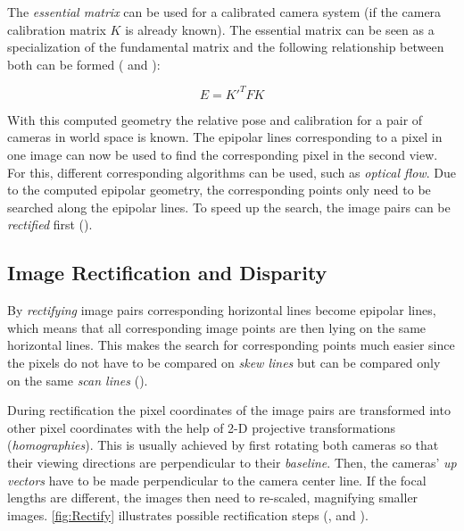 The \textit{essential matrix} can be used for a calibrated camera system (if the camera calibration matrix $K$ is already known). The essential matrix can be seen as a specialization of the fundamental matrix and the following relationship between both can be formed (\cite[p.310]{Luhmann.2014} and \cite[p.257]{Hartley.2011}): 

\begin{equation}
 E = K'^T FK\label{eq:essentialMatrix}
\end{equation}

With this computed geometry the relative pose and calibration for a pair of cameras in world space is known. The epipolar lines corresponding to a pixel in one image can now be used to find the corresponding pixel in the second view. For this, different corresponding algorithms can be used, such as \textit{optical flow}. Due to the computed epipolar geometry, the corresponding points only need to be searched along the epipolar lines. To speed up the search, the image pairs can be \textit{rectified} first (\cite[p.472 et seq.]{Szeliski.2011}).

\subsection{Image Rectification and Disparity}\label{ssec:RectificationDisp}
By \textit{rectifying} image pairs corresponding horizontal lines become epipolar lines, which means that all corresponding image points are then lying on the same horizontal lines. This makes the search for corresponding points much easier since the pixels do not have to be compared on \textit{skew lines} but can be compared only on the same \textit{scan lines} (\cite[p.1]{Loop.2001}).


During rectification the pixel coordinates of the image pairs are transformed into other pixel coordinates with the help of 2-D projective transformations (\textit{homographies}). This is usually achieved by first rotating both cameras so that their viewing directions are perpendicular to their \textit{baseline}. Then, the cameras' \textit{up vectors} have to be made perpendicular to the camera center line. If the focal lengths are different, the images then need to re-scaled, magnifying smaller images. \autoref{fig:Rectify} illustrates possible rectification steps (\cite[p.1]{Loop.2001}, \cite[p.473]{Szeliski.2011} and \cite[p.436]{Luhmann.2014}).

